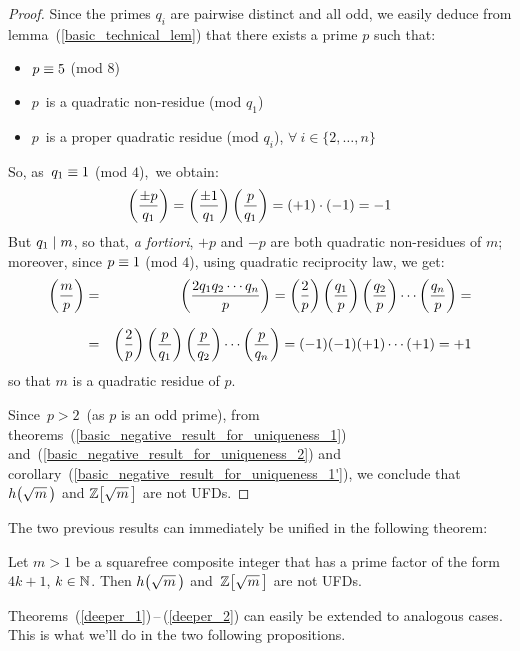 \begin{proof}
%
Since the primes $q_i$ are pairwise distinct and all odd, we easily
deduce from lemma~(\ref{basic_technical_lem}) that there exists
a prime $p$ such that:

\begin{itemize}

\item $p \equiv 5$ (mod 8)

\item $p$\, is a quadratic non-residue (mod $q_1$)

\item $p$\, is a proper quadratic residue (mod $q_i$),
$\forall\: i \in \{2, \ldots, n\}$

\end{itemize}

So, as\, $q_1 \equiv 1$ (mod $4$),\, we obtain:
$$
\left(\frac{\pm{p}}{q_1}\right) = \left(\frac{\pm{1}}{q_1}\right)\left(\frac{p}{q_1}\right)
= (+1) \cdot (-1) = -1
$$
But $q_1 \mid m$, so that, \emph{a fortiori}, $+p$ and $-p$
are both quadratic non-residues of $m$; moreover, since
$p \equiv 1$ (mod $4$), using quadratic reciprocity law, we get:
\medskip
\setlength\arraycolsep{2pt}
\begin{eqnarray*}
\left(\frac{m}{p}\right) & = &\left(\frac{2 q_1 q_2 \cdots q_n}{p}\right) =
\left(\frac{2}{p}\right)\left(\frac{q_1}{p}\right) \left(\frac{q_2}{p}\right) \cdots
\left(\frac{q_n}{p}\right) = \\[7pt]
& = & \left(\frac{2}{p}\right)\left(\frac{p}{q_1}\right) \left(\frac{p}{q_2}\right) \cdots
\left(\frac{p}{q_n}\right) = (-1)(-1)(+1)\cdots(+1) = +1
\end{eqnarray*}
{\flushleft
so that $m$ is a quadratic residue of $p$.}

Since\, $p > 2$\, (as $p$ is an odd prime), from
theorems~(\ref{basic_negative_result_for_uniqueness_1})
and~(\ref{basic_negative_result_for_uniqueness_2})
and corollary~(\ref{basic_negative_result_for_uniqueness_1'}),
we conclude that $\hh{m}$ and $\ZZ{m}$ are not UFDs.
%
\end{proof}

The two previous results can immediately be unified
in the following theorem:

\begin{thm}\label{deeper_3} 
Let $m > 1$ be a squarefree composite integer that has
a prime factor of the form $4k + 1$, $k \in \mathbb{N}$.
Then $\hh{m}$ and \,$\ZZ{m}$ are not UFDs.
\end{thm}

\mbox{Theorems (\ref{deeper_1})\,--\,(\ref{deeper_2})}
can easily be extended to analogous cases.
This is what we'll do in the two following propositions.

